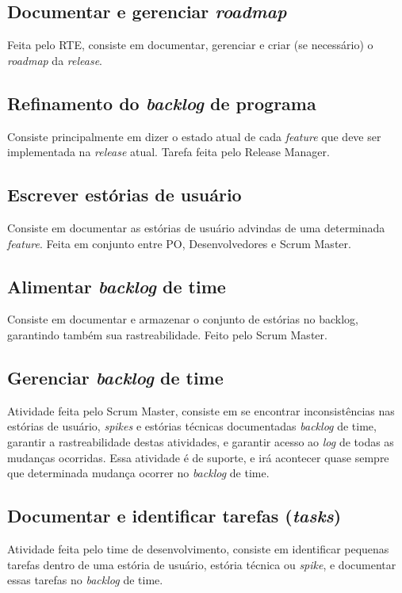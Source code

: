 \subsection{Documentar e gerenciar \emph{roadmap}}
Feita pelo RTE, consiste em documentar, gerenciar e criar (se necessário) o \emph{roadmap} da \emph{release}.

\subsection{Refinamento do \emph{backlog} de programa}
Consiste principalmente em dizer o estado atual de cada \emph{feature} que deve ser implementada na \emph{release} atual. Tarefa feita pelo Release Manager.

\subsection{Escrever estórias de usuário}
Consiste em documentar as estórias de usuário advindas de uma determinada \emph{feature}. Feita em conjunto entre PO, Desenvolvedores e Scrum Master.

\subsection{Alimentar \emph{backlog} de time}
Consiste em documentar e armazenar o conjunto de estórias no backlog, garantindo também sua rastreabilidade. Feito pelo Scrum Master.

\subsection{Gerenciar \emph{backlog} de time}
Atividade feita pelo Scrum Master, consiste em se encontrar inconsistências nas estórias de usuário, \emph{spikes} e estórias técnicas documentadas \emph{backlog} de time, garantir a rastreabilidade destas atividades, e garantir acesso ao \emph{log} de todas as mudanças ocorridas. Essa atividade é de suporte, e irá acontecer quase sempre que determinada mudança ocorrer no \emph{backlog} de time.

\subsection{Documentar e identificar tarefas (\emph{tasks})}
Atividade feita pelo time de desenvolvimento, consiste em identificar pequenas tarefas dentro de uma estória de usuário, estória técnica ou \emph{spike}, e documentar essas tarefas no \emph{backlog} de time.

